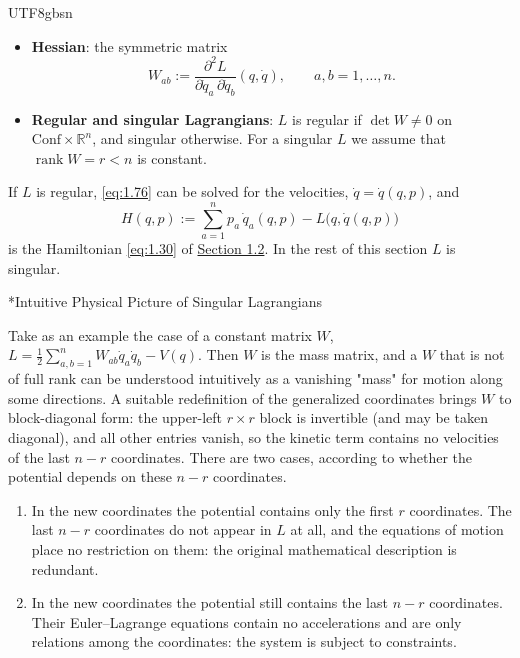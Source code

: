 \documentclass[11pt,a4paper,oneside]{report}
\makeatletter
\newcommand\topic{\@startsection{paragraph}{4}{\z@}{-1.7ex plus -.3ex}{.5ex}{\normalfont\normalsize\bfseries\itshape\boldmath}*}
\makeatother
\begin{document}
\begin{CJK*}{UTF8}{gbsn}
\begin{itemize}
\item \textbf{\boldmath Hessian}: the symmetric matrix
\begin{equation*}
W_{ab}:=\frac{\partial^2L}{\partial\dot q_a\,\partial\dot q_b}(q,\dot q),\qquad a,b=1,\ldots,n.
\tag{1.77}\label{eq:1.77}
\end{equation*}

\item \textbf{\boldmath Regular and singular Lagrangians}: $L$ is regular if $\det W\neq0$ on $\mathrm{Conf}\times\mathbb R^n$, and singular otherwise. For a singular $L$ we assume that $\operatorname{rank}W=r<n$ is constant.
\end{itemize}


If $L$ is regular, \eqref{eq:1.76} can be solved for the velocities, $\dot q=\dot q(q,p)$, and
\begin{equation*}
H(q,p):=\sum_{a=1}^np_a\,\dot q_a(q,p)-L\bigl(q,\dot q(q,p)\bigr)
\tag{1.78}\label{eq:1.78}
\end{equation*}
is the Hamiltonian \eqref{eq:1.30} of \hyperref[hamiltonian-formalism]{Section 1.2}. In the rest of this section $L$ is singular.

\topic{Intuitive Physical Picture of Singular Lagrangians}

Take as an example the case of a constant matrix $W$, $L=\frac12\sum_{a,b=1}^nW_{ab}\dot q_a\dot q_b-V(q)$. Then $W$ is the mass matrix, and a $W$ that is not of full rank can be understood intuitively as a vanishing "mass" for motion along some directions. A suitable redefinition of the generalized coordinates brings $W$ to block-diagonal form: the upper-left $r\times r$ block is invertible (and may be taken diagonal), and all other entries vanish, so the kinetic term contains no velocities of the last $n-r$ coordinates. There are two cases, according to whether the potential depends on these $n-r$ coordinates.
\begin{enumerate}


\item In the new coordinates the potential contains only the first $r$ coordinates. The last $n-r$ coordinates do not appear in $L$ at all, and the equations of motion place no restriction on them: the original mathematical description is redundant.

\item In the new coordinates the potential still contains the last $n-r$ coordinates. Their Euler–Lagrange equations contain no accelerations and are only relations among the coordinates: the system is subject to constraints.
\end{enumerate}



\end{CJK*}
\end{document}
